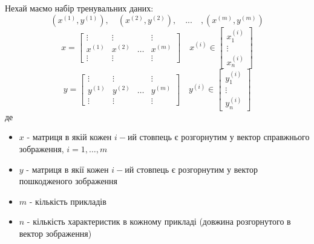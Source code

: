\documentclass[14pt,a4paper]{extarticle}
\newcounter{e}
\numberwithin{equation}{section}
\numberwithin{figure}{section}
\newcommand{\ith}{^{(i)}}
\begin{document}
	Нехай маємо набір тренувальних даних:
	\begin{equation*}
		(x^{(1)}, y^{(1)}), \quad (x^{(2)}, y^{(2)}), \quad ... \quad ,(x^{(m)}, y^{(m)})
	\end{equation*}
	\begin{equation*}
		\quad
		x =	
		\begin{bmatrix}
			\vdots  & \vdots  & & \vdots \\
			x^{(1)} & x^{(2)} &   \dots & x^{(m)}\\
			\vdots  & \vdots  & & \vdots
		\end{bmatrix}
		\quad
		x\ith \in
		\begin{bmatrix}
			x\ith_1   \\
			\vdots \\
			x\ith_n
		\end{bmatrix}
		\quad
	\end{equation*}
	\begin{equation*}
		\quad
		y =	
		\begin{bmatrix}
			\vdots  & \vdots  & & \vdots \\
			y^{(1)} & y^{(2)} &   \dots & y^{(m)}\\
			\vdots  & \vdots  & & \vdots
		\end{bmatrix}
		\quad
		y\ith \in
		\begin{bmatrix}
			y\ith_1   \\
			\vdots \\
			y\ith_n
		\end{bmatrix}
		\quad
	\end{equation*}
	де
	\begin{itemize}
		\item $x$ - матриця в якій кожен $i-$ий стовпець є розгорнутим у вектор справжнього зображення, $i=1,\dots,m$
		\item $y$ - матриця в якії кожен $i-$ий стовпець є розгорнутим у вектор пошкодженого зображення
		\item $m$ - кількість прикладів
		\item $n$ - кількість характеристик в кожному прикладі (довжина розгорнутого в вектор зображення)
	\end{itemize}
\end{document}
